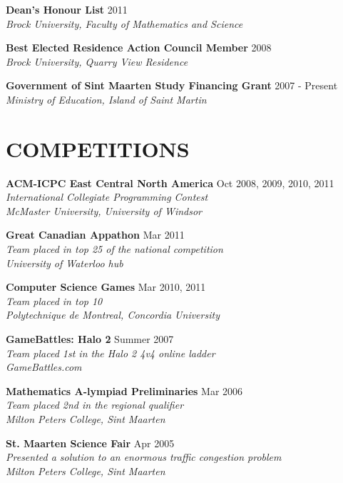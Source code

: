 \documentclass[margin]{res}
\begin{document}
\begin{resume}
  \textbf{Dean's Honour List} \hfill 2011 \\
    {\sl Brock University, Faculty of Mathematics and Science}

  \textbf{Best Elected Residence Action Council Member} \hfill 2008 \\
    {\sl Brock University, Quarry View Residence}

  \textbf{Government of Sint Maarten Study Financing Grant} \hfill 2007 - Present \\
    {\sl Ministry of Education, Island of Saint Martin}
 
\section{COMPETITIONS}

  \textbf{ACM-ICPC East Central North America} \hfill Oct 2008, 2009, 2010, 2011 \\
    {\sl International Collegiate Programming Contest} \\
    {\sl McMaster University, University of Windsor} %

  \textbf{Great Canadian Appathon} \hfill Mar 2011 \\
    {\sl Team placed in top 25 of the national competition} \\
    {\sl University of Waterloo hub}

  \textbf{Computer Science Games} \hfill Mar 2010, 2011 \\
    {\sl Team placed in top 10} \\
    {\sl Polytechnique de Montreal, Concordia University}

  \textbf{GameBattles: Halo 2} \hfill Summer 2007 \\
    {\sl Team placed 1st in the Halo 2 4v4 online ladder} \\
    {\sl GameBattles.com}

  \textbf{Mathematics A-lympiad Preliminaries} \hfill Mar 2006 \\
    {\sl Team placed 2nd in the regional qualifier} \\
    {\sl Milton Peters College, Sint Maarten}

  \textbf{St. Maarten Science Fair} \hfill Apr 2005 \\
    {\sl Presented a solution to an enormous traffic congestion problem} \\
    {\sl Milton Peters College, Sint Maarten}



\end{resume}
\end{document}
